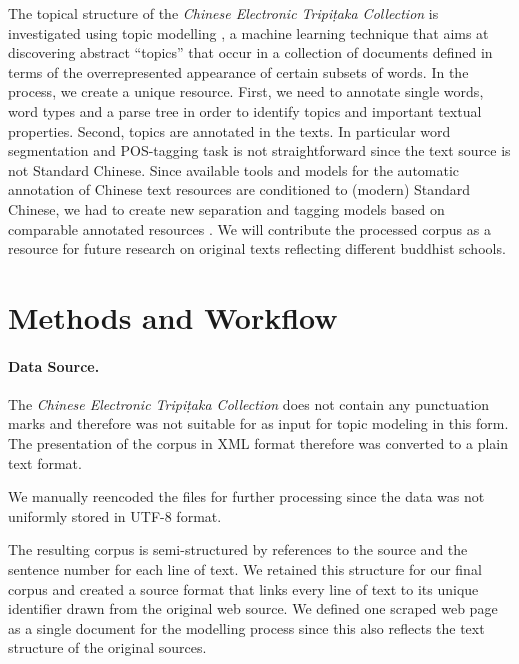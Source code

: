 \documentclass[a4paper,10pt]{article}
\newcommand{\TODO}[1]{\begingroup\color{red}#1\endgroup}
\newcommand{\NR}[1]{\begingroup\color{orange}#1\endgroup}
\begin{document}
The topical structure of the \textit{Chinese Electronic Tripi{\d{t}}aka
  Collection}  is investigated using topic
modelling \cite{blei2012probabilistic}, a machine learning technique that
aims at discovering abstract ``topics'' that occur in a collection of
documents defined in terms of the overrepresented appearance of certain
subsets of words. In the process, we create a unique resource. First, we
need to annotate single words, word types and a parse tree in order to
identify topics and important textual properties. Second, topics are
annotated in the texts.  In particular word segmentation and POS-tagging
task is not straightforward since the text source is not Standard
Chinese. Since available tools and models for the automatic annotation of
Chinese text resources are conditioned to (modern) Standard Chinese, we had
to create new separation and tagging models based on comparable annotated
resources .  We will contribute the processed
corpus as a resource for future research on original texts reflecting
different buddhist schools.

\section{Methods and Workflow} 

\paragraph{Data Source.} The \textit{Chinese Electronic Tripi{\d{t}}aka
  Collection} \cite{} does not contain any punctuation marks and therefore
was not suitable for as input for topic modeling in this form. The
presentation of the corpus in XML format 
therefore was converted to a plain text format.
  
  We manually reencoded the files for further processing \NR{since the data
  was not uniformly stored in UTF-8 format}.

  The resulting corpus is semi-structured by references to the source and
  the sentence number for each line of text. We retained this structure for
  our final corpus and created a source format that links every line of
  text to its unique identifier drawn from the original web source. We
  defined one scraped web page as a single document for the modelling
  process since this also reflects the text structure of the original
  sources.
    
\end{document}
